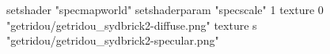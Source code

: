 setshader "specmapworld"
setshaderparam "specscale" 1
texture 0 "getridou/getridou_sydbrick2-diffuse.png"
texture s "getridou/getridou_sydbrick2-specular.png"
